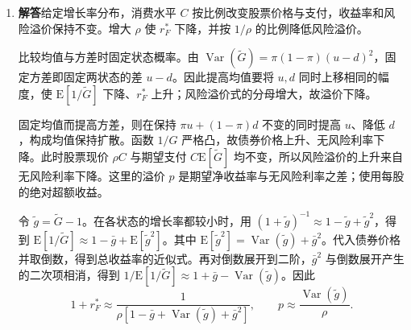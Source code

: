 \begin{solution}[blank-type=manual,blank-vsep=12\baselineskip]
\begin{enumerate}[label=(\alph*)]
 \item \textbf{解答}\quad 给定增长率分布，消费水平 $C$ 按比例改变股票价格与支付，收益率和风险溢价保持不变。增大 $\rho$ 使 $r_F^*$ 下降，并按 $1/\rho$ 的比例降低风险溢价。

 比较均值与方差时固定状态概率。由 $\operatorname{Var}(\widetilde G)=\pi(1-\pi)(u-d)^2$，固定方差即固定两状态的差 $u-d$。因此提高均值要将 $u,d$ 同时上移相同的幅度，使 $\mathrm E[1/\widetilde G]$ 下降、$r_F^*$ 上升；风险溢价式的分母增大，故溢价下降。

 固定均值而提高方差，则在保持 $\pi u+(1-\pi)d$ 不变的同时提高 $u$、降低 $d$，构成均值保持扩散。函数 $1/G$ 严格凸，故债券价格上升、无风险利率下降。此时股票现价 $\rho C$ 与期望支付 $C\mathrm E[\widetilde G]$ 均不变，所以风险溢价的上升来自无风险利率下降。这里的溢价 $p$ 是期望净收益率与无风险利率之差；使用每股的绝对超额收益。

 令 $\tilde g=\widetilde G-1$。在各状态的增长率都较小时，用 $(1+\tilde g)^{-1}\approx1-\tilde g+\tilde g^2$，得到 $\mathrm E[1/\widetilde G]\approx1-\bar g+\mathrm E[\tilde g^2]$。其中 $\mathrm E[\tilde g^2]=\operatorname{Var}(\tilde g)+\bar g^2$。代入债券价格并取倒数，得到总收益率的近似式。再对倒数展开到二阶，$\bar g^2$ 与倒数展开产生的二次项相消，得到 $1/\mathrm E[1/\widetilde G]\approx1+\bar g-\operatorname{Var}(\tilde g)$。因此
 \[
 1+r_F^*\approx\frac1{\rho[1-\bar g+\operatorname{Var}(\tilde g)+\bar g^2]},\qquad
 p\approx\frac{\operatorname{Var}(\tilde g)}\rho.
 \]

\end{enumerate}
\end{solution}

